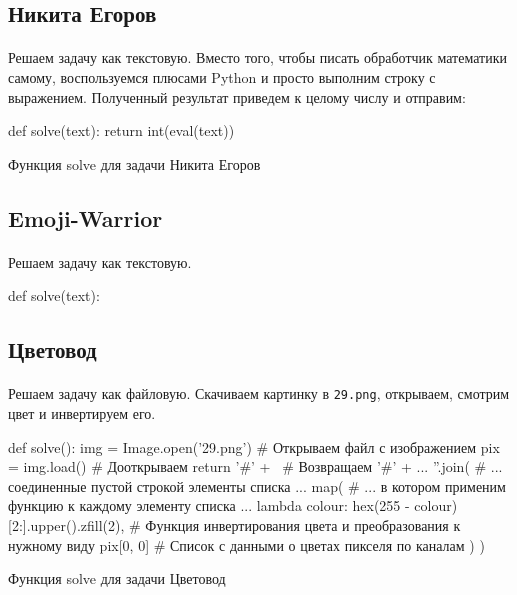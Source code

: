 \documentclass[12pt]{article}
\begin{document}
    \subsection{Никита Егоров}
    \paragraph{}
    Решаем задачу как текстовую.
    Вместо того, чтобы писать обработчик математики самому, воспользуемся плюсами Python и просто выполним
    строку с выражением.
    Полученный результат приведем к целому числу и отправим:
    \begin{listing}[H]
        \begin{pythoncode}
def solve(text):
    return int(eval(text))
        \end{pythoncode}
        \label{lst:solve6}
        \caption{Функция solve для задачи Никита Егоров}
    \end{listing}

    \subsection{Emoji-Warrior}
    \paragraph{}
    Решаем задачу как текстовую.
    \begin{pythoncode}
def solve(text):
    \end{pythoncode}

    \subsection{Цветовод}
    \paragraph{}
    Решаем задачу как файловую.
    Скачиваем картинку в \verb|29.png|, открываем, смотрим цвет и инвертируем его.
    \begin{listing}[H]
        \begin{pythoncode}
def solve():
    img = Image.open('29.png')   # Открываем файл с изображением
    pix = img.load()             # Дооткрываем
    return '#' + \               # Возвращаем '#' + ...
           ''.join(              # ... соединенные пустой строкой элементы списка ...
               map(              # ... в котором применим функцию к каждому элементу списка ...
                   lambda colour: hex(255 - colour)[2:].upper().zfill(2),
                                 # Функция инвертирования цвета и преобразования к нужному виду
                   pix[0, 0]     # Список с данными о цветах пикселя по каналам
               )
           )
        \end{pythoncode}
        \label{lst:solve29}
        \caption{Функция solve для задачи Цветовод}
    \end{listing}
\end{document}
